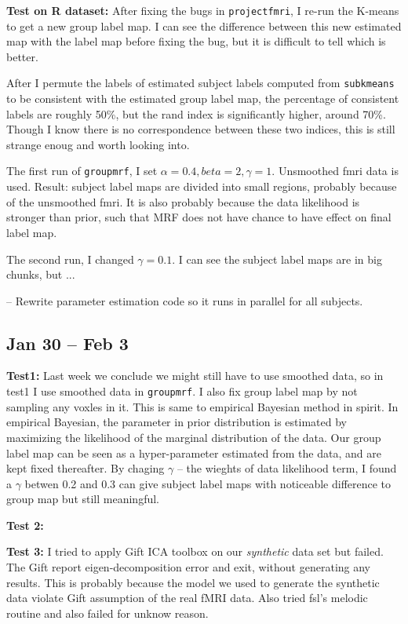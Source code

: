 \documentclass{article}
\begin{document}
\textbf{Test on R dataset: } After fixing the bugs in \texttt{projectfmri}, I re-run the K-means to get a new group label map. I can see the difference between this new estimated map with the label map before fixing the bug, but it is difficult to tell which is better. 

After I permute the labels of estimated subject labels computed from \texttt{subkmeans} to be consistent with the estimated group label map, the percentage of consistent labels are roughly 50\%, but the rand index is significantly higher, around 70\%. Though I know there is no correspondence between these two indices, this is still strange enoug and worth looking into.

The first run of \texttt{groupmrf}, I set $\alpha = 0.4, beta = 2, \gamma=1$. Unsmoothed fmri data is used. Result: subject label maps are divided into small regions, probably because of the unsmoothed fmri. It is also probably because the data likelihood is stronger than prior, such that MRF does not have chance to have effect on final label map.

The second run, I changed $\gamma=0.1$. I can see the subject label maps are in big chunks, but ...

-- Rewrite parameter estimation code so it runs in parallel for all subjects.

\subsection{Jan 30 -- Feb 3}
\textbf{Test1:} Last week we conclude we might still have to use smoothed data, so in test1 I use smoothed data in \texttt{groupmrf}. I also fix group label map by not sampling any voxles in it. This is same to empirical Bayesian method in spirit. In empirical Bayesian, the parameter in prior distribution is estimated by maximizing the likelihood of the marginal distribution of the data. Our group label map can be seen as a hyper-parameter estimated from the data, and are kept fixed thereafter. By chaging $\gamma$ -- the wieghts of data likelihood term, I found a $\gamma$ betwen 0.2 and 0.3 can give subject label maps with noticeable difference to group map but still meaningful.

\textbf{Test 2:}

\textbf{Test 3:} I tried to apply Gift ICA toolbox on our \emph{synthetic} data set but failed. The Gift report eigen-decomposition error and exit, without generating any results. This is probably because the model we used to generate the synthetic data violate Gift assumption of the real fMRI data. Also tried fsl's melodic routine and also failed for unknow reason.
\end{document}
